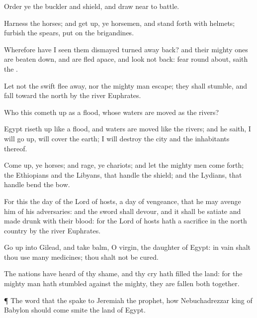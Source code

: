 {Order ye the
buckler and
shield, and draw
near to
battle.

Harness the
horses; and get
up, ye
horsemen, and stand
forth with
{}
helmets;
furbish the
spears,
{} put
on the
brigandines.

Wherefore have I
seen them
dismayed
{}
turned away
back? and their mighty
ones are beaten
down, and are
fled
apace, and look not
back:
{}
fear
{} round
about,
saith the
{}.

Let not the
swift flee
away, nor the mighty
man
escape; they shall
stumble, and
fall toward the
north
by the
river
Euphrates.

Who
{} this
{} cometh
up as a
flood, whose
waters are
moved as the
rivers?

Egypt riseth
up like a
flood, and
{}
waters are
moved like the
rivers; and he
saith, I will go
up,
{} will
cover the
earth; I will
destroy the
city and the
inhabitants thereof.

Come
up, ye
horses; and
rage, ye
chariots; and let the mighty
men come
forth; the
Ethiopians and the
Libyans, that
handle the
shield; and the
Lydians, that
handle
{}
bend the
bow.

For this
{} the
day of the
Lord
{} of
hosts, a
day of
vengeance, that he may
avenge him of his
adversaries: and the
sword shall
devour, and it shall be
satiate and made
drunk with their
blood: for the
Lord
{} of
hosts hath a
sacrifice in the
north
country by the
river
Euphrates.

Go
up into
Gilead, and
take
balm, O
virgin, the
daughter of
Egypt: in
vain shalt thou use
many
medicines;
{} thou shalt not be
cured.


\par }{\PP {}The
nations have
heard of thy
shame, and thy
cry hath
filled the
land: for the mighty
man hath
stumbled against the
mighty,
{} they are
fallen
both
together.


\par }{\PP {}¶ The
word that the
{}
spake to
Jeremiah the
prophet, how
Nebuchadrezzar
king of
Babylon should
come
{}
smite the
land of
Egypt.

}
